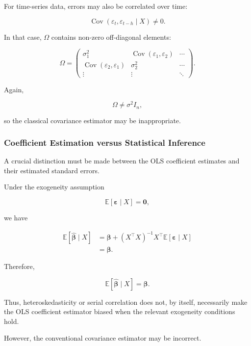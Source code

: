 For time-series data, errors may also be correlated over time:

\[
\operatorname{Cov}
(\varepsilon_t,\varepsilon_{t-h}\mid X)
\neq0.
\]

In that case, \(\Omega\) contains non-zero off-diagonal elements:

\[
\Omega
=
\begin{pmatrix}
\sigma_1^2
&
\operatorname{Cov}(\varepsilon_1,\varepsilon_2)
&
\cdots
\\
\operatorname{Cov}(\varepsilon_2,\varepsilon_1)
&
\sigma_2^2
&
\cdots
\\
\vdots
&
\vdots
&
\ddots
\end{pmatrix}.
\]

Again,

\[
\Omega
\neq
\sigma^2I_n,
\]

so the classical covariance estimator may be inappropriate.



\subsubsection*{Coefficient Estimation versus Statistical Inference}

A crucial distinction must be made between the OLS coefficient estimates and
their estimated standard errors.

Under the exogeneity assumption

\[
\boxed{
\mathbb{E}
[
\boldsymbol{\varepsilon}\mid X
]
=
\mathbf{0},
}
\]

we have

\[
\begin{aligned}
\mathbb{E}
[
\widehat{\boldsymbol{\beta}}\mid X
]
&=
\boldsymbol{\beta}
+
(X^\top X)^{-1}
X^\top
\mathbb{E}
[
\boldsymbol{\varepsilon}\mid X
]
\\
&=
\boldsymbol{\beta}.
\end{aligned}
\]

Therefore,

\[
\boxed{
\mathbb{E}
[
\widehat{\boldsymbol{\beta}}\mid X
]
=
\boldsymbol{\beta}.
}
\]

Thus, heteroskedasticity or serial correlation does not, by itself,
necessarily make the OLS coefficient estimator biased when the relevant
exogeneity conditions hold.

However, the conventional covariance estimator may be incorrect.

